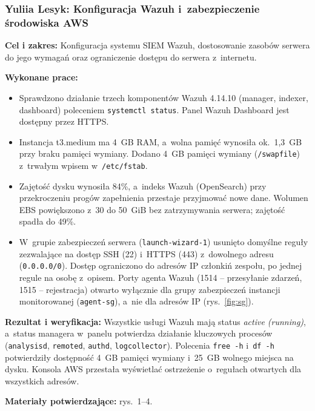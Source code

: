 \documentclass[11pt,a4paper,oneside]{article}
\newcommand{\studentB}{{Yuliia Lesyk}}
\begin{document}
\subsubsection{\studentB: Konfiguracja Wazuh i~zabezpieczenie środowiska AWS}\label{zadanie-b1}
\textbf{Cel i zakres:} Konfiguracja systemu SIEM Wazuh, dostosowanie zasobów serwera do jego wymagań oraz ograniczenie dostępu do serwera z~internetu.\par
\textbf{Wykonane prace:}
\begin{itemize}
\item Sprawdzono działanie trzech komponentów Wazuh 4.14.10 (manager, indexer, dashboard) poleceniem \texttt{systemctl status}. Panel Wazuh Dashboard jest dostępny przez HTTPS.
\item Instancja t3.medium ma 4~GB RAM, a~wolna pamięć wynosiła ok.~1,3~GB przy braku pamięci wymiany. Dodano 4~GB pamięci wymiany (\texttt{/swapfile}) z~trwałym wpisem w~\texttt{/etc/fstab}.
\item Zajętość dysku wynosiła 84\%, a~indeks Wazuh (OpenSearch) przy przekroczeniu progów zapełnienia przestaje przyjmować nowe dane. Wolumen EBS powiększono z~30 do 50~GiB bez zatrzymywania serwera; zajętość spadła do 49\%.
\item W~grupie zabezpieczeń serwera (\texttt{launch-wizard-1}) usunięto domyślne reguły zezwalające na dostęp SSH (22) i~HTTPS (443) z~dowolnego adresu (\texttt{0.0.0.0/0}). Dostęp ograniczono do adresów IP członkiń zespołu, po jednej regule na osobę z~opisem. Porty agenta Wazuh (1514 -- przesyłanie zdarzeń, 1515 -- rejestracja) otwarto wyłącznie dla grupy zabezpieczeń instancji monitorowanej (\texttt{agent-sg}), a~nie dla adresów IP (rys.~\ref{fig:sg}).
\end{itemize}
\textbf{Rezultat i weryfikacja:} Wszystkie usługi Wazuh mają status \textit{active (running)}, a~status managera w~panelu potwierdza działanie kluczowych procesów (\texttt{analysisd}, \texttt{remoted}, \texttt{authd}, \texttt{logcollector}). Polecenia \texttt{free -h} i~\texttt{df -h} potwierdziły dostępność 4~GB pamięci wymiany i~25~GB wolnego miejsca na dysku. Konsola AWS przestała wyświetlać ostrzeżenie o~regułach otwartych dla wszystkich adresów.\par
\textbf{Materiały potwierdzające:} rys.~1--4.

\end{document}
